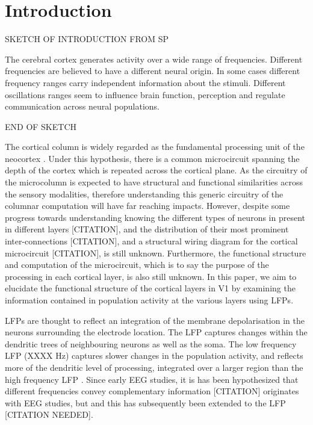 \section{Introduction}
%
%
%

SKETCH OF INTRODUCTION FROM SP

The cerebral cortex generates activity over a wide range of frequencies. Different frequencies are believed to have a different neural origin. In some cases different frequency ranges carry independent information about the stimuli. Different oscillations ranges seem to influence brain function, perception and regulate communication across neural populations. 

END OF SKETCH

The cortical column is widely regarded as the fundamental processing unit of the neocortex \citep{Mountcastle1957}.
Under this hypothesis, there is a common microcircuit spanning the depth of the cortex which is repeated across the cortical plane.
As the circuitry of the microcolumn is expected to have structural and functional similarities across the sensory modalities, therefore understanding this generic circuitry of the columnar computation will have far reaching impacts.
However, despite some progress towards understanding knowing the different types of neurons in present in different layers [CITATION], and the distribution of their most prominent inter-connections [CITATION], and a structural wiring diagram for the cortical microcircuit [CITATION], is still unknown.
Furthermore, the functional structure and computation of the microcircuit, which is to say the purpose of the processing in each cortical layer, is also still unknown.
In this paper, we aim to elucidate the functional structure of the cortical layers in \ac{V1} by examining the information contained in population activity at the various layers using \acp{LFP}.

\acp{LFP} are thought to reflect an integration of the membrane depolarisation in the neurons surrounding the electrode location.
The \ac{LFP} captures changes within the dendritic trees of neighbouring neurons as well as the soma.
The low frequency \ac{LFP} (XXXX \si{Hz}) captures slower changes in the population activity, and reflects more of the dendritic level of processing, integrated over a larger region than the high frequency \ac{LFP} \citep{Leski2013}.
Since early \ac{EEG} studies, it is has been hypothesized that different frequencies convey complementary information [CITATION] originates with \ac{EEG} studies, but and this has subsequently been extended to the \ac{LFP} [CITATION NEEDED].


